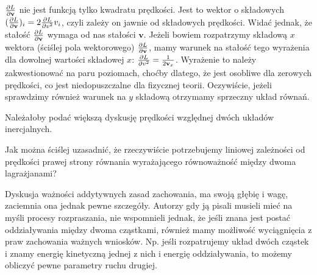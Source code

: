 \documentclass[a4paper,11pt]{article}
\begin{document}
\vspace{\spaceFour}





\noindent
{} $\frac{ \partial L }{ \partial \mathbf{v} }$ nie jest
funkcją tylko kwadratu prędkości. Jest to wektor o składowych
$( \frac{ \partial L }{ \partial \mathbf{v} } )_{ i } = 2 \frac{
  \partial L }{ \partial { v^{ 2 } } } v_{ i }$, czyli zależy on
jawnie od składowych prędkości. Widać jednak, że stałość
$\frac{ \partial L }{ \partial \mathbf{v} }$ wymaga od nas stałości
$\mathbf{ v }$. Jeżeli bowiem rozpatrzymy składową $x$ wektora
(ściślej pola wektorowego)
$\frac{ \partial L }{ \partial \mathbf{v} }$, mamy warunek na stałość
tego wyrażenia dla dowolnej wartości składowej $x$:
$\frac{ \partial L }{ \partial { v^{ 2 } } } = \frac{ 1 }{ 2
  \mathbf{v}_{ x } }$. Wyrażenie to należy zakwestionować na paru
poziomach, choćby dlatego, że jest osobliwe dla zerowych prędkości, co
jest niedopuszczalne dla fizycznej teorii. Oczywiście, jeżeli
sprawdzimy również warunek na $y$ składową otrzymamy sprzeczny układ
równań.

\vspace{\spaceFour}





\noindent
{} Należałoby podać większą dyskusję prędkości względnej dwóch
układów inercjalnych.

\vspace{\spaceFour}





\noindent
{} Jak można ściślej uzasadnić, że rzeczywiście
potrzebujemy liniowej zależności od prędkości prawej strony równania
wyrażającego równoważność między dwoma lagrażjanami? \Dok

\vspace{\spaceFour}




\noindent
{} Dyskusja ważności addytywnych zasad zachowania, ma
swoją głębię i wagę, zaciemnia ona jednak pewne szczegóły. Autorzy gdy
ją pisali musieli mieć na myśli procesy rozpraszania, nie wspomnieli
jednak, że jeśli znana jest postać oddziaływania między dwoma
cząstkami, również mamy możliwość wyciągnięcia z praw zachowania
ważnych wniosków. Np. jeśli rozpatrujemy układ dwóch cząstek i znamy
energię kinetyczną jednej z nich i energię oddziaływania, to możemy
obliczyć pewne parametry ruchu drugiej.
\end{document}
